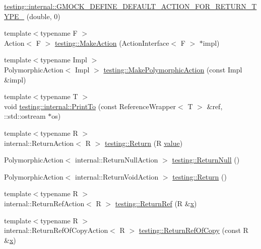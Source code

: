 \begin{DoxyCompactItemize}
\mbox{\hyperlink{namespacetesting_1_1internal_a7ba92aa33f4968c902623cd02e445020}{testing\+::internal\+::\+G\+M\+O\+C\+K\+\_\+\+D\+E\+F\+I\+N\+E\+\_\+\+D\+E\+F\+A\+U\+L\+T\+\_\+\+A\+C\+T\+I\+O\+N\+\_\+\+F\+O\+R\+\_\+\+R\+E\+T\+U\+R\+N\+\_\+\+T\+Y\+P\+E\+\_\+}} (double, 0)
\item 
{\footnotesize template$<$typename F $>$ }\\Action$<$ F $>$ \mbox{\hyperlink{namespacetesting_aa254d28c8d883899cbf11ea2f05fc195}{testing\+::\+Make\+Action}} (Action\+Interface$<$ F $>$ $\ast$impl)
\item 
{\footnotesize template$<$typename Impl $>$ }\\Polymorphic\+Action$<$ Impl $>$ \mbox{\hyperlink{namespacetesting_a45df529b8166936d970884383f0ede82}{testing\+::\+Make\+Polymorphic\+Action}} (const Impl \&impl)
\item 
{\footnotesize template$<$typename T $>$ }\\void \mbox{\hyperlink{namespacetesting_1_1internal_a8fd10cc30084c36a89c74868c8bd53f8}{testing\+::internal\+::\+Print\+To}} (const Reference\+Wrapper$<$ T $>$ \&ref, \+::std\+::ostream $\ast$os)
\item 
{\footnotesize template$<$typename R $>$ }\\internal\+::\+Return\+Action$<$ R $>$ \mbox{\hyperlink{namespacetesting_adae3994eb444d1ad2dd602454b854663}{testing\+::\+Return}} (R \mbox{\hyperlink{_obj__test_2lib_2googletest-master_2googlemock_2test_2gmock-matchers__test_8cc_a337b8a670efc0b086ad3af163f3121b6}{value}})
\item 
Polymorphic\+Action$<$ internal\+::\+Return\+Null\+Action $>$ \mbox{\hyperlink{namespacetesting_af05e07c0484961f2a30ba44d1d1816fe}{testing\+::\+Return\+Null}} ()
\item 
Polymorphic\+Action$<$ internal\+::\+Return\+Void\+Action $>$ \mbox{\hyperlink{namespacetesting_a492ba67db1dfe5dc8257b6e3d38b8183}{testing\+::\+Return}} ()
\item 
{\footnotesize template$<$typename R $>$ }\\internal\+::\+Return\+Ref\+Action$<$ R $>$ \mbox{\hyperlink{namespacetesting_ac17089d5ca6377944d3792fbdc5c5d9b}{testing\+::\+Return\+Ref}} (R \&\mbox{\hyperlink{_obj__test_2lib_2googletest-master_2googlemock_2test_2gmock-matchers__test_8cc_a6150e0515f7202e2fb518f7206ed97dc}{x}})
\item 
{\footnotesize template$<$typename R $>$ }\\internal\+::\+Return\+Ref\+Of\+Copy\+Action$<$ R $>$ \mbox{\hyperlink{namespacetesting_ab84f2bf2f22aa75d8b52887bfc7d218c}{testing\+::\+Return\+Ref\+Of\+Copy}} (const R \&\mbox{\hyperlink{_obj__test_2lib_2googletest-master_2googlemock_2test_2gmock-matchers__test_8cc_a6150e0515f7202e2fb518f7206ed97dc}{x}})

\end{DoxyCompactItemize}
